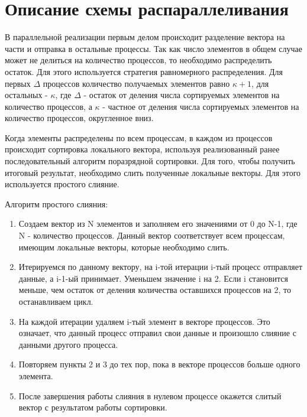 \documentclass{report}
\begin{document}
	\section*{Описание схемы распараллеливания}
	В параллельной реализации первым делом происходит разделение вектора на части и отправка в остальные процессы. Так как число элементов в общем случае может не делиться на количество процессов, то необходимо распределить остаток. Для этого используется стратегия равномерного распределения. Для первых \(\Delta\) процессов количество получаемых элементов равно \(\kappa + 1\), для остальных - \(\kappa\), где \(\Delta\) - остаток от деления числа сортируемых элементов на количество процессов, а \(\kappa\) - частное от деления числа сортируемых элементов на количество процессов, округленное вниз.
	\par Когда элементы распределены по всем процессам, в каждом из процессов происходит сортировка локального вектора, используя реализованный ранее последовательный алгоритм поразрядной сортировки. Для того, чтобы получить итоговый результат, необходимо слить полученные локальные векторы. Для этого используется простого слияние.
	\par Алгоритм простого слияния:
	\begin{enumerate}
		\item Создаем вектор из N элементов и заполняем его значениями от 0 до N-1, где N - количество процессов. Данный вектор соответствует всем процессам, имеющим локальные векторы, которые необходимо слить.
		\item Итерируемся по данному вектору, на i-той итерации i-тый процесс отправляет данные, а i-1-ый принимает. Уменьшем значение i на 2. Если i становится меньше, чем остаток от деления количества оставшихся процессов на 2, то останавливаем цикл.
		\item На каждой итерации удаляем i-тый элемент в векторе процессов. Это означает, что данный процесс отправил свои данные и произошло слияние с данными другого процесса.
		\item Повторяем пункты 2 и 3 до тех пор, пока в векторе процессов больше одного элемента.
		\item После завершения работы слияния в нулевом процессе окажется слитый вектор с результатом работы сортировки.
	\end{enumerate}
	\newpage
	
\end{document}
